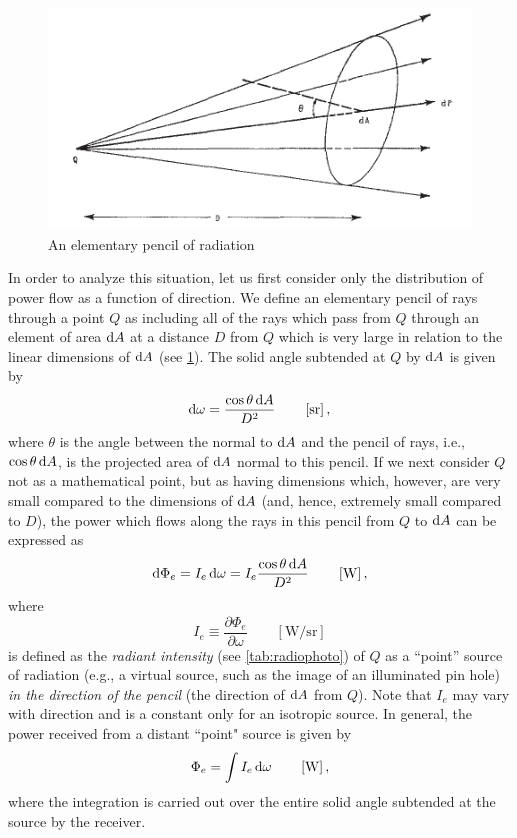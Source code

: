 \begin{refsection}
\begin{figure}
\begin{center}
\includegraphics{figures/nicodemus1963-fig1.pdf}
\end{center}
\caption{An elementary pencil of radiation}
\label{fig:nicodemus1}
\end{figure}

In order to analyze this situation, let us first consider only the distribution
of power flow as a function of direction. We define an elementary pencil of rays
through a point $Q$ as including all of the rays which pass from $Q$ through an
element of area $\mathop{}\!\mathrm{d} A$ at a distance $D$ from $Q$ which is very large in relation
to
the linear dimensions of $\mathop{}\!\mathrm{d} A$ (see \cref{fig:nicodemus1}).
The solid angle subtended at $Q$ by $\mathop{}\!\mathrm{d} A$ is given by
\begin{equation*}
\d\omega = \frac{\cos\theta \d A}{D^2}
\qquad \left[\unit{\steradian}\right],
\end{equation*}
where $\theta$ is the angle between the normal to $\mathop{}\!\mathrm{d} A$ and the pencil of rays,
i.e., $\cos\theta \mathop{}\!\mathrm{d} A$, is the projected area of $\mathop{}\!\mathrm{d} A$ normal to this pencil.
If we next consider $Q$ not as a mathematical point, but as having dimensions
which, however, are very small compared to the dimensions of $\mathop{}\!\mathrm{d} A$ (and, hence,
extremely small compared to $D$), the power which flows along the rays in this
pencil from $Q$ to $\mathop{}\!\mathrm{d} A$ can be expressed as
\begin{equation*}
\d\Phi_e = I_e \d\omega = I_e \frac{\cos\theta \d A}{D^2}
\qquad \left[\unit{\watt}\right],
\end{equation*}
where
\begin{equation}
I_e \equiv \frac{\partial \Phi_e}{\partial \omega}
\qquad \left[\unit{\watt\per\steradian}\right]
\end{equation}
is defined as the \textsl{radiant intensity} (see \cref{tab:radiophoto}) of
$Q$ as a “point” source of radiation (e.g., a virtual source, such as the image
of an illuminated pin hole) \emph{in the direction of the pencil} (the direction of
$\mathop{}\!\mathrm{d} A$ from $Q$). Note that $I_e$ may vary with direction and is a constant only
for an isotropic source. In general, the power received from a distant “point"
source is given by
\begin{equation}
\Phi_e = \int I_e \d\omega
\qquad \left[\unit{\watt}\right],
\end{equation}
where the integration is carried out over the entire solid angle subtended at
the source by the receiver.


\end{refsection}
